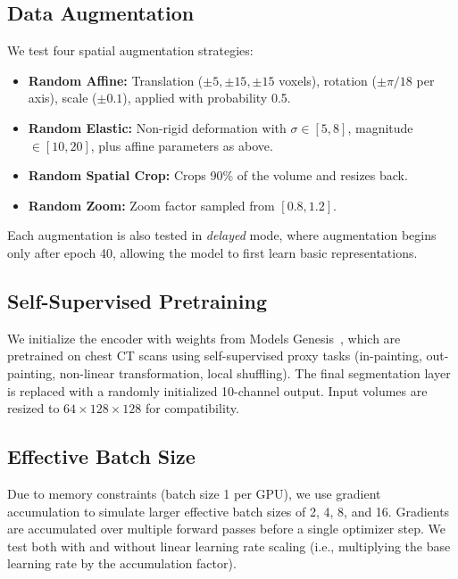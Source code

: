 \documentclass[10pt,twocolumn]{article}
\begin{document}
\subsection{Data Augmentation}
\label{sec:augmentation}

We test four spatial augmentation strategies:

\begin{itemize}[leftmargin=*]
    \item \textbf{Random Affine:} Translation ($\pm5, \pm15, \pm15$ voxels), rotation ($\pm\pi/18$ per axis), scale ($\pm0.1$), applied with probability 0.5.
    \item \textbf{Random Elastic:} Non-rigid deformation with $\sigma \in [5,8]$, magnitude $\in [10,20]$, plus affine parameters as above.
    \item \textbf{Random Spatial Crop:} Crops 90\% of the volume and resizes back.
    \item \textbf{Random Zoom:} Zoom factor sampled from $[0.8, 1.2]$.
\end{itemize}

Each augmentation is also tested in \textit{delayed} mode, where augmentation begins only after epoch 40, allowing the model to first learn basic representations.

\subsection{Self-Supervised Pretraining}
\label{sec:ssl}

We initialize the encoder with weights from Models Genesis~\cite{zhou2021models}, which are pretrained on chest CT scans using self-supervised proxy tasks (in-painting, out-painting, non-linear transformation, local shuffling). The final segmentation layer is replaced with a randomly initialized 10-channel output. Input volumes are resized to $64 \times 128 \times 128$ for compatibility.

\subsection{Effective Batch Size}
\label{sec:batchsize}

Due to memory constraints (batch size 1 per GPU), we use gradient accumulation to simulate larger effective batch sizes of 2, 4, 8, and 16. Gradients are accumulated over multiple forward passes before a single optimizer step. We test both with and without linear learning rate scaling (i.e., multiplying the base learning rate by the accumulation factor).
\end{document}
